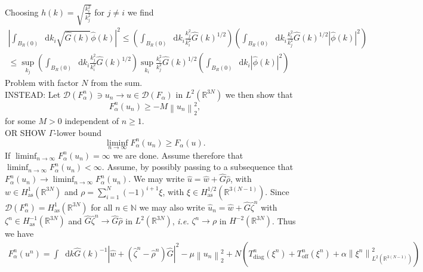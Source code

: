 \documentclass[a4paper,11pt]{article}
\newcommand{\norm}[1]{\left\lVert #1 \right\rVert}
\newcommand{\abs}[1]{\left\lvert #1 \right\rvert}
\newcommand{\dom}[1]{\mathscr D\left(#1\right)}
\newcommand*\diff{\mathop{}\!\mathrm{d}}
\newcommand{\ie}{\emph{i.e.} }
\newcommand{\R}{\mathbb{R}}
\numberwithin{equation}{section}
\begin{document}
Choosing $ h(k)=\sqrt{\frac{k_i^2}{k_j^2}} $ for $ j\neq i $ we find
\begin{equation}
\begin{aligned}
\left\lvert\int_{B_R(0)}\diff k_i\sqrt{\hat{G}(k)}\hat{\phi}(k)\right\rvert^2
\leq \left(\int_{B_R(0)}\diff k_i\frac{k_j^2}{k_i^2}\hat{G}(k)^{1/2}\right)\left(\int_{B_R(0)}\diff k_i \frac{k_i^2}{k_j^2}\hat{G}(k)^{1/2}\abs{\hat{\phi}(k)}^2\right)\\
\leq \sup_{k_j}\left(\int_{B_R(0)}\diff k_i\frac{k_j^2}{k_i^2}\hat{G}(k)^{1/2}\right)\sup_{k_i}\frac{k_i^2}{k_j^2}\hat{G}(k)^{1/2}\left(\int_{B_R(0)}\diff k_i \abs{\hat{\phi}(k)}^2\right)
\end{aligned}
\end{equation}
Problem with factor $ N $ from the sum.\vspace{0.5cm}\\
INSTEAD: Let $ \dom{F^n_\alpha}\ni u_n\to u\in\dom{F_\alpha} $ in $ L^2(\R^{3N}) $ we then show that \begin{equation}
F_\alpha^n(u_n)\geq-M\norm{u_n}_2^2,
\end{equation}
for some $ M>0 $ independent of $ n\geq1 $.
\vspace{0.5cm}\\
OR SHOW $ \Gamma $-lower bound\begin{equation}
\liminf_{n\to\infty}F^n_\alpha(u_n)\geq F_\alpha(u).
\end{equation}
If $ \liminf_{n\to\infty}F_\alpha^n(u_n)=\infty $ we are done. Assume therefore that $ \liminf_{n\to\infty}F_\alpha^n(u_n)<\infty $.
Assume, by possibly passing to a subsequence that $ F_\alpha^n(u_n)\to\liminf_{n\to\infty}F_\alpha^n(u_n) $. We may write $ \hat{u}=\hat{w}+\hat{G}\hat{\rho} $, with $ w\in H_\text{as}^1(\R^{3N}) $ and $ \rho=\sum_{i=1}^{N}(-1)^{i+1}\xi $, with $ \xi\in H_{\text{as}}^{1/2}(\R^{3(N-1)}) $. Since $ \dom{F_\alpha^n}=H_{\text{as}}^1(\R^{3N}) $ for all $ n\in\mathbb{N} $ we may also write $ \hat{u}_n=\hat{w}+\hat{G}\hat{\zeta}^n $ with $ \zeta^n\in H_{\text{as}}^{-1}(\R^{3N}) $ and $ \hat{G}\hat{\zeta}^n\to\hat{G}\hat{\rho} $ in $ L^2(\R^{3N}) $, \ie $ \zeta^n\to\rho $ in $ H^{-2}(\R^{3N}) $. Thus we have\begin{equation}
\begin{aligned}
F_\alpha^n(u^n)
=\int\diff k \hat{G}(k)^{-1}\abs{\hat{w}+(\hat{\zeta}^n-\hat{\rho}^n)\hat{G}}^2-\mu\norm{u_n}^2_2+N\left(T^n_{\text{diag}}(\xi^n)+T^n_{\text{off}}(\xi^n)+\alpha\norm{\xi^n}^2_{L^2(\R^{3(N-1)})}\right)
\end{aligned}
\end{equation}
\end{document}
